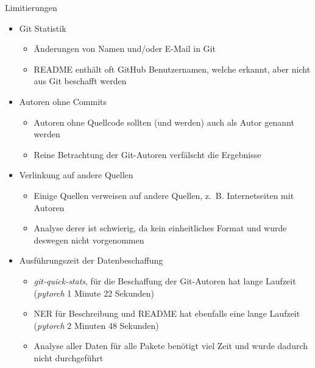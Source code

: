\documentclass[%
    handout,
    aspectratio=1610,
    10pt,
    onlytextwidth, %
]{beamer}
\begin{document}
\begin{frame}{Limitierungen}
    \begin{itemize}
        \item Git Statistik
        \begin{itemize}
            \item Änderungen von Namen und/oder E-Mail in Git %
            \item README enthält oft GitHub Benutzernamen, welche erkannt, aber nicht aus Git beschafft werden
        \end{itemize}
        \item Autoren ohne Commits
        \begin{itemize}
            \item Autoren ohne Quellcode sollten (und werden) auch als Autor genannt werden
            \item Reine Betrachtung der Git-Autoren verfälscht die Ergebnisse
        \end{itemize}
        \item Verlinkung auf andere Quellen
        \begin{itemize}
            \item Einige Quellen verweisen auf andere Quellen, z.~B. Internetseiten mit Autoren
            \item Analyse derer ist schwierig, da kein einheitliches Format und wurde deswegen nicht vorgenommen
        \end{itemize}
        \item Ausführungszeit der Datenbeschaffung
        \begin{itemize}
            \item \emph{git-quick-stats}, für die Beschaffung der Git-Autoren hat lange Laufzeit (\emph{pytorch} 1 Minute 22 Sekunden)
            \item NER für Beschreibung und README hat ebenfalls eine lange Laufzeit (\emph{pytorch} 2 Minuten 48 Sekunden)
            \item Analyse aller Daten für alle Pakete benötigt viel Zeit und wurde dadurch nicht durchgeführt
        \end{itemize}
    \end{itemize}
\end{frame}
\end{document}
